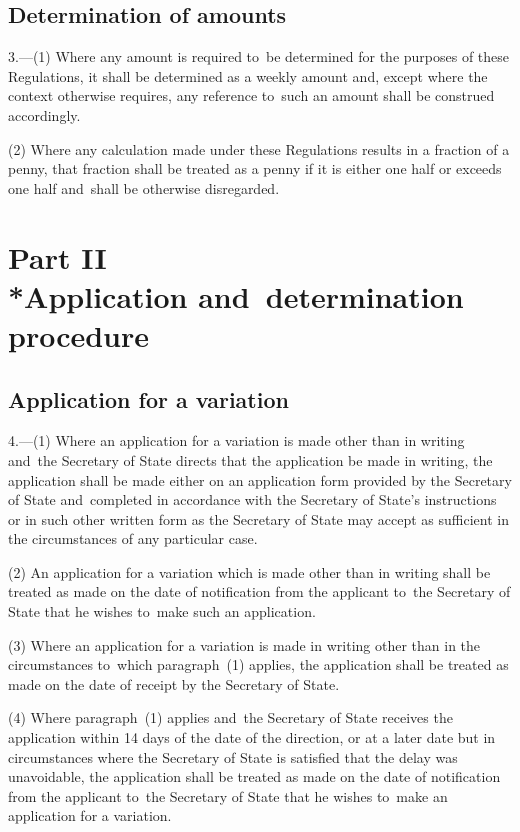 \documentclass[12pt,a4paper]{article}
\begin{document}
\subsection[3. Determination of amounts]{Determination of amounts}

3.---(1)  Where any amount is required to~be determined for the purposes of these Regulations, it shall be determined as a weekly amount and, except where the context otherwise requires, any reference to~such an amount shall be construed accordingly.

(2) Where any calculation made under these Regulations results in a fraction of a penny, that fraction shall be treated as a penny if it is either one half or exceeds one half and~shall be otherwise disregarded.

\vfill

\section[Part II --- Application and~determination procedure]{Part II\\*Application and~determination procedure}

\renewcommand\parthead{--- Part II}

\subsection[4. Application for a variation]{Application for a variation}

4.---(1)  Where an application for a variation is made other than in writing and~the Secretary of State directs that the application be made in writing, the application shall be made either on an application form provided by the Secretary of State and~completed in accordance with the Secretary of State’s instructions or in such other written form as the Secretary of State may accept as sufficient in the circumstances of any particular case.

(2) An application for a variation which is made other than in writing shall be treated as made on the date of notification from the applicant to~the Secretary of State that he wishes to~make such an application.

(3) Where an application for a variation is made in writing other than in the circumstances to~which paragraph~(1) applies, the application shall be treated as made on the date of receipt by the Secretary of State.

(4) Where paragraph~(1) applies and~the Secretary of State receives the application within 14 days of the date of the direction, or at a later date but in circumstances where the Secretary of State is satisfied that the delay was unavoidable, the application shall be treated as made on the date of notification from the applicant to~the Secretary of State that he wishes to~make an application for a variation.
\end{document}

